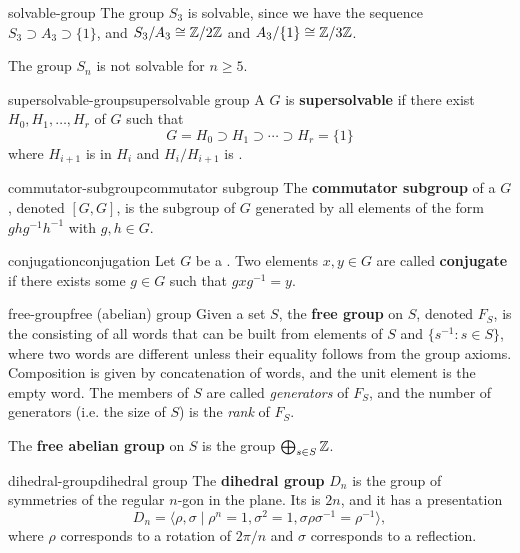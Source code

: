 \begin{example}{solvable-group}
    The group $S_3$ is solvable, since we have the sequence $S_3 \supset A_3 \supset \{ 1 \}$, and $S_3 / A_3 \cong \mathbb{Z}/2\mathbb{Z}$ and $A_3/\{ 1 \} \cong \mathbb{Z}/3\mathbb{Z}$.
    
    The group $S_n$ is not solvable for $n \ge 5$.
\end{example}

\begin{topic}{supersolvable-group}{supersolvable group}
    A  $G$ is \textbf{supersolvable} if there exist  $H_0, H_1, \ldots, H_r$ of $G$ such that
    \[ G = H_0 \supset H_1 \supset \cdots \supset H_r = \{ 1 \} \]
    where $H_{i + 1}$ is  in $H_i$ and $H_i/H_{i + 1}$ is .
\end{topic}

\begin{topic}{commutator-subgroup}{commutator subgroup}
    The \textbf{commutator subgroup} of a  $G$, denoted $[G, G]$, is the subgroup of $G$ generated by all elements of the form $ghg^{-1}h^{-1}$ with $g, h \in G$.
\end{topic}

\begin{topic}{conjugation}{conjugation}
    Let $G$ be a . Two elements $x, y \in G$ are called \textbf{conjugate} if there exists some $g \in G$ such that $g x g^{-1} = y$.
\end{topic}

\begin{topic}{free-group}{free (abelian) group}
    Given a set $S$, the \textbf{free group} on $S$, denoted $F_S$, is the  consisting of all words that can be built from elements of $S$ and $\{ s^{-1} : s \in S \}$, where two words are different unless their equality follows from the group axioms. Composition is given by concatenation of words, and the unit element is the empty word. The members of $S$ are called \textit{generators} of $F_S$, and the number of generators (i.e. the size of $S$) is the \textit{rank} of $F_S$.

    The \textbf{free abelian group} on $S$ is the  group $\bigoplus_{s \in S} \mathbb{Z}$.
\end{topic}

\begin{topic}{dihedral-group}{dihedral group}
    The \textbf{dihedral group} $D_n$ is the group of symmetries of the regular $n$-gon in the plane. Its  is $2n$, and it has a presentation
    \[ D_n = \langle \rho, \sigma \mid \rho^n = 1, \sigma^2 = 1, \sigma \rho \sigma^{-1} = \rho^{-1} \rangle , \]
    where $\rho$ corresponds to a rotation of $2 \pi / n$ and $\sigma$ corresponds to a reflection.
\end{topic}

